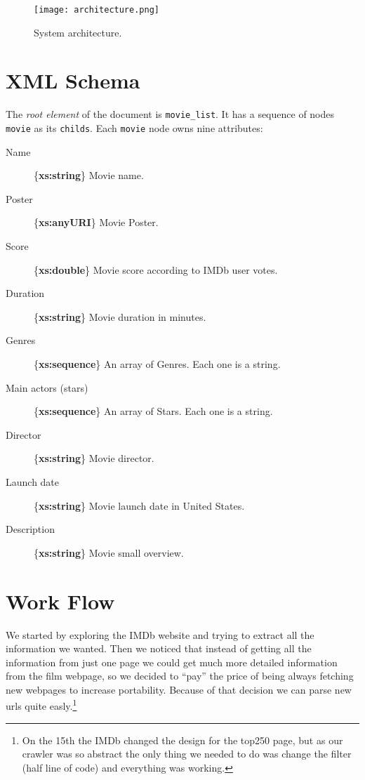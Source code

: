 \documentclass[a4paper]{article}
\begin{document}
\begin{figure}[h!]
	\centering
	\texttt{[image: architecture.png]}
	\caption{System architecture.}
\end{figure}

\clearpage
\section{XML Schema}
\indent \indent The \emph{root element} of the document is \texttt{movie\_list}. It has a sequence of nodes \texttt{movie} as its \texttt{childs}.
Each \texttt{movie} node owns nine attributes:
\begin{description}
	\item [Name] \{\textbf{xs:string}\}
		Movie name.
	\item [Poster] \{\textbf{xs:anyURI}\}
		Movie Poster.
	\item [Score] \{\textbf{xs:double}\}
		Movie score according to IMDb user votes.
	\item [Duration] \{\textbf{xs:string}\}
		Movie duration in minutes.
	\item [Genres] \{\textbf{xs:sequence}\}
		An array of Genres. Each one is a string.
	\item [Main actors (stars)] \{\textbf{xs:sequence}\}
		An array of Stars. Each one is a string.
	\item [Director] \{\textbf{xs:string}\}
		Movie director.
	\item [Launch date] \{\textbf{xs:string}\}
		Movie launch date in United States.
	\item [Description] \{\textbf{xs:string}\}
		Movie small overview.
\end{description}

\clearpage
\section{Work Flow}
\indent \indent We started by exploring the IMDb website and trying to extract all the information we wanted. Then we noticed that instead of getting all the information from just one page we could get much more detailed information from the film webpage, so we decided to ``pay'' the price of being always fetching new webpages to increase portability. Because of that decision we can parse new urls quite easly.\footnote{On the 15th the IMDb changed the design for the top250 page, but as our crawler was so abstract the only thing we needed to do was change the filter (half line of code) and everything was working.}
\end{document}
